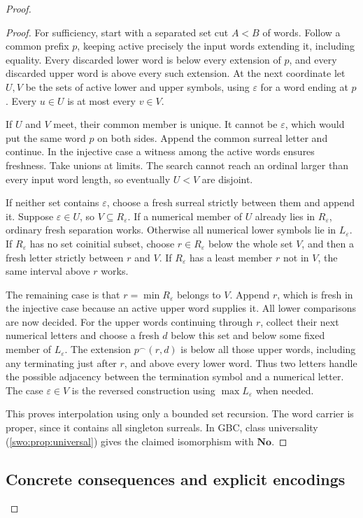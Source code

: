 \documentclass[11pt]{article}
\theoremstyle{definition}
\theoremstyle{remark}
\newcommand{\No}{\mathbf{No}}
\newcommand{\cat}{\mathbin{{}^\frown}}
\begin{document}
\begin{proof}
\begin{proof}
For sufficiency, start with a separated set cut $A<B$ of words. Follow a
common prefix $p$, keeping active precisely the input words extending
it, including equality. Every discarded lower word is below every
extension of $p$, and every discarded upper word is above every such
extension. At the next coordinate let $U,V$ be the sets of active lower
and upper symbols, using $\varepsilon$ for a word ending at $p$.
Every $u\in U$ is at most every $v\in V$.

If $U$ and $V$ meet, their common member is unique. It cannot be
$\varepsilon$, which would put the same word $p$ on both sides. Append
the common surreal letter and continue. In the injective case a witness
among the active words ensures freshness. Take unions at limits. The
search cannot reach an ordinal larger than every input word length, so
eventually $U<V$ are disjoint.

If neither set contains $\varepsilon$, choose a fresh surreal strictly
between them and append it. Suppose $\varepsilon\in U$, so
$V\subseteq R_\varepsilon$. If a numerical member of $U$ already lies
in $R_\varepsilon$, ordinary fresh separation works. Otherwise all
numerical lower symbols lie in $L_\varepsilon$.
If $R_\varepsilon$ has no set coinitial subset, choose
$r\in R_\varepsilon$ below the whole set $V$, and then a fresh letter
strictly between $r$ and $V$. If $R_\varepsilon$ has a least member
$r$ not in $V$, the same interval above $r$ works.

The remaining case is that $r=\min R_\varepsilon$ belongs to $V$.
Append $r$, which is fresh in the injective case because an active upper
word supplies it. All lower comparisons are now decided. For the upper
words continuing through $r$, collect their next numerical letters and
choose a fresh $d$ below this set and below some fixed member of
$L_\varepsilon$. The extension $p\cat(r,d)$ is below all those upper
words, including any terminating just after $r$, and above every lower
word. Thus two letters handle the possible adjacency between the
termination symbol and a numerical letter. The case
$\varepsilon\in V$ is the reversed construction using
$\max L_\varepsilon$ when needed.

This proves interpolation using only a bounded set recursion. The word
carrier is proper, since it contains all singleton surreals. In GBC,
class universality (\cref{swo:prop:universal}) gives the claimed isomorphism with $\No$.
\end{proof}

\subsection{Concrete consequences and explicit encodings}


\end{proof}
\end{document}
